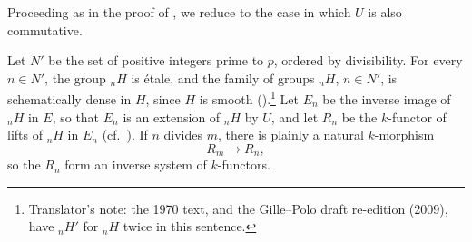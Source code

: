 


Proceeding as in the proof of , we reduce to the case in
which \(U\) is also commutative.

Let \(N'\) be the set of positive integers prime to \(p\), ordered
by divisibility.  For every \(n\in N'\), the group \({}_nH\) is
étale, and the family of groups \({}_nH\), \(n\in N'\), is
schematically dense in \(H\), since \(H\) is smooth
().\footnote{Translator's note: the 1970 text, and the Gille--Polo draft re-edition (2009), have
\({}_nH'\) for \({}_nH\) twice in this sentence.}  Let \(E_n\) be the inverse image of
\({}_nH\) in \(E\), so that \(E_n\) is an extension of
\({}_nH\) by \(U\), and let \(R_n\) be the \(k\)-functor of
lifts of \({}_nH\) in \(E_n\) (cf.\ ).  If \(n\)
divides \(m\), there is plainly a natural \(k\)-morphism
\[
  R_m\longrightarrow R_n,
\]
so the \(R_n\) form an inverse system of \(k\)-functors.
